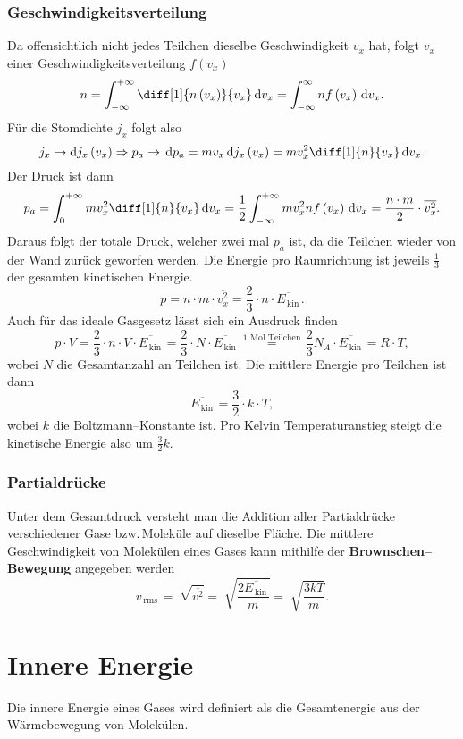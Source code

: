 \documentclass[a4paper,12pt]{article}
\newcommand{\td}{\,\text{d}}
\begin{document}
\subsubsection{Geschwindigkeitsverteilung}
Da offensichtlich nicht jedes Teilchen dieselbe Geschwindigkeit $v_x$ hat, folgt $v_x$ einer Geschwindigkeitsverteilung $f\left(v_x\right)$ 
\[ 
        n=\int_{-\infty}^{+\infty}\diff[1]{n\left(v_x\right)}{v_x}\td v_x=\int_{-\infty}^{\infty}n f\left(v_x\right)\td v_x
.\] 
Für die Stomdichte $j_x$ folgt also
\[ 
        j_x\rightarrow \text{d}j_x\left(v_x\right)\Rightarrow p_a\rightarrow \,\text{d}p_a=mv_x\,\text{d}j_x\left(v_x\right)=mv_x^2\diff[1]{n}{v_x}\,\text{d}v_x
.\] 
Der Druck ist dann
\[ 
        p_a=\int_{0}^{+\infty}mv_x^2\diff[1]{n}{v_x}\td v_x=\dfrac{1}{2}\int_{-\infty}^{+\infty}mv_x^2n f\left(v_x\right)\td v_x=\dfrac{n\cdot m}{2}\cdot \overline{v_x^2}
.\] 
Daraus folgt der totale Druck, welcher zwei mal $p_a$ ist, da die Teilchen wieder von der Wand zurück geworfen werden. Die Energie pro Raumrichtung ist jeweils $\tfrac{1}{3}$ der gesamten kinetischen Energie.
\[ 
        p=n\cdot m\cdot \overline{v_x^2}=\dfrac{2}{3}\cdot n\cdot \overline{E_{\,\text{kin}\,}}
.\] 
Auch für das ideale Gasgesetz lässt sich ein Ausdruck finden
\[ 
        p\cdot V=\dfrac{2}{3}\cdot n\cdot V\cdot \overline{E_{\,\text{kin}\,}}=\dfrac{2}{3}\cdot N\cdot \overline{E_{\,\text{kin}\,}}\stackrel{\,\text{$1$ Mol Teilchen}\,}{=}\dfrac{2}{3}N_A\cdot \overline{E_{\,\text{kin}\,}}=R\cdot T
,\] 
wobei $N$ die Gesamtanzahl an Teilchen ist. Die mittlere Energie pro Teilchen ist dann
\[ 
        \overline{E_{\,\text{kin}\,}}=\dfrac{3}{2}\cdot k\cdot T
,\] 
wobei $k$ die Boltzmann--Konstante ist. Pro Kelvin Temperaturanstieg steigt die kinetische Energie also um $\tfrac{3}{2}k$.

\subsubsection{Partialdrücke}
Unter dem Gesamtdruck versteht man die Addition aller Partialdrücke verschiedener Gase bzw.\,Moleküle auf dieselbe Fläche. Die mittlere Geschwindigkeit von Molekülen eines Gases kann mithilfe der \textbf{Brownschen--Bewegung} angegeben werden
\[ 
        v_{\,\text{rms}\,}=\sqrt[ ]{\overline{v^2}}=\sqrt[ ]{\dfrac{2\overline{E_{\,\text{kin}\,}} }{m}}=\sqrt[ ]{\dfrac{3kT}{m}}
.\] 

\newpage
\section{Innere Energie}
Die innere Energie eines Gases wird definiert als die Gesamtenergie aus der Wärmebewegung von Molekülen.
\end{document}
